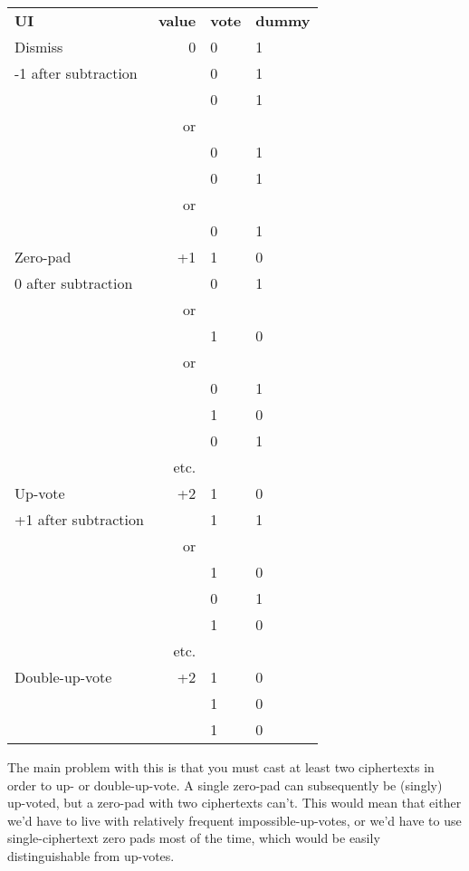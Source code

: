 \documentclass[10pt,a4paper]{article}
\begin{document}
\begin{tabular}{lrll}
	{\bf UI}  & {\bf value }&{\bf  vote} &{\bf  dummy }\\
	Dismiss   & 0          & 0          & 1    \\
  -1 after subtraction    	&       & 0          & 1    \\ 
	&            & 0          & 1    \\ 
	& or  & & \\		  
	&            & 0          & 1    \\ 
&            & 0          & 1    \\ 

	& or  & & \\		  
	&            & 0          & 1    \\ \hline
Zero-pad	 & +1          & 1          & 0    \\
0 after subtraction&           & 0          & 1    \\   
& or  & & \\
&            & 1          & 0    \\
& or & & \\
&            & 0          & 1    \\   
&            & 1          & 0    \\  
&            & 0          & 1    \\   
& etc. & & \\ \hline
	
	Up-vote   & +2          & 1          & 0    \\
+1 after subtraction	&            & 1          & 1    \\   
	& or  & & \\
	&            & 1          & 0    \\
	&            & 0          & 1    \\   
	&            & 1          & 0    \\  
	& etc. & & \\ \hline
	Double-up-vote & +2          & 1          & 0    \\
	&            & 1          & 0    \\     
		&            & 1          & 0    \\     \hline
\end{tabular}

The main problem with this is that you must cast at least two ciphertexts in order to up- or double-up-vote. A single zero-pad can subsequently be (singly) up-voted, but a zero-pad with two ciphertexts can't. This would mean that either we'd have to live with relatively frequent impossible-up-votes, or we'd have to use single-ciphertext zero pads most of the time, which would be easily distinguishable from up-votes.
\end{document}
